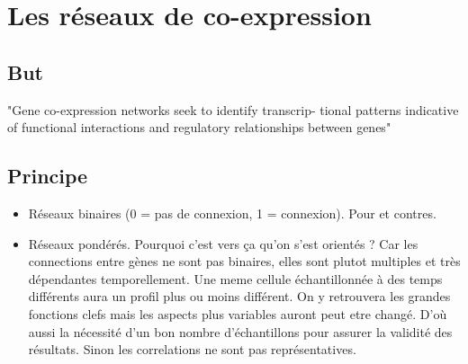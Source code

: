 \section{Les réseaux de  co-expression}



\subsection{But}
"Gene co-expression networks seek to identify transcrip- tional patterns indicative of functional interactions and regulatory relationships between genes" %

\subsection{Principe}
\begin{itemize}
    \item Réseaux binaires (0 = pas de connexion, 1 = connexion). Pour et contres.
    \item Réseaux pondérés. Pourquoi c'est vers ça qu'on s'est orientés ? Car les connections entre gènes ne sont pas binaires, elles sont plutot multiples et très dépendantes temporellement. Une meme cellule échantillonnée à des temps différents aura un profil plus ou moins différent. On y retrouvera les grandes fonctions clefs mais les aspects plus variables auront peut etre changé. D'où aussi la nécessité d'un bon nombre d'échantillons pour assurer la validité des résultats. Sinon les correlations ne sont pas représentatives.
\end{itemize}

